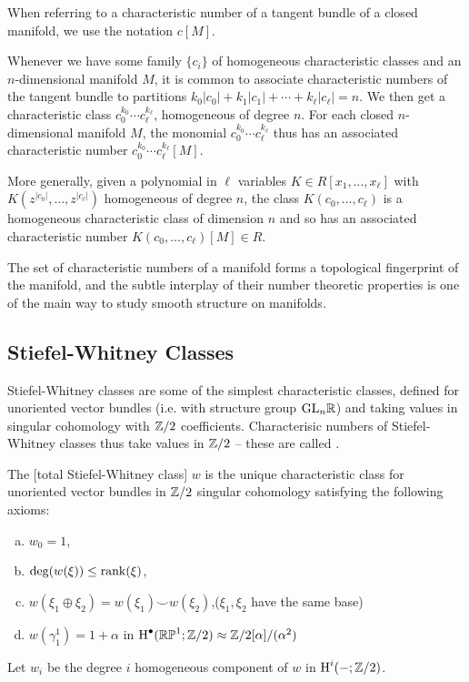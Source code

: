 \begin{convention*}
	When referring to a characteristic number of a tangent bundle of a closed manifold, we use the notation $c[M]$.
\end{convention*}

\begin{remark}\label{rmk:characteristic-number-monomial-polynomial}
	Whenever we have some family $\{c_i\}$ of homogeneous characteristic classes and an $n$-dimensional manifold $M$, it is common to associate characteristic numbers of the tangent bundle to partitions $k_0|c_0|+k_1|c_1|+\cdots+k_\ell|c_\ell| = n$. We then get a characteristic class $c_0^{k_0}\cdots c_\ell^{k_\ell}$, homogeneous of degree $n$. For each closed $n$-dimensional manifold $M$, the monomial $c_0^{k_0}\cdots c_\ell^{k_\ell}$ thus has an associated characteristic number $c_0^{k_0}\cdots c_\ell^{k_\ell}[M]$.

	More generally, given a polynomial in $\ell$ variables $K\in R[x_1,\ldots, x_\ell]$ with $K(z^{|c_0|}, \ldots, z^{|c_\ell|})$ homogeneous of degree $n$, the class $K(c_0,\ldots, c_\ell)$ is a homogeneous characteristic class of dimension $n$ and so has an associated characteristic number $K(c_0, \ldots, c_\ell)[M] \in R$.
\end{remark}

The set of characteristic numbers of a manifold forms a topological fingerprint of the manifold, and the subtle interplay of their number theoretic properties is one of the main way to study smooth structure on manifolds.

\subsection{Stiefel-Whitney Classes}

Stiefel-Whitney classes are some of the simplest characteristic classes, defined for unoriented vector bundles (i.e. with structure group $\mathrm{GL}_n\mathbb{R}$) and taking values in singular cohomology with $\mathbb{Z}/2$ coefficients. Characterisic numbers of Stiefel-Whitney classes thus take values in $\mathbb{Z}/2$ -- these are called .

\begin{definition}
	The [total Stiefel-Whitney class] $w$ is the unique characteristic class for unoriented vector bundles in $\mathbb{Z}/2$ singular cohomology satisfying the following axioms:
	\begin{enumerate}[(a)]
		\item $w_0=1$,
		\item $\deg(w(\xi))\leq \operatorname{rank}(\xi)$,
		\item $w(\xi_1\oplus \xi_2)=w(\xi_1)\smile w(\xi_2)$,\hfill ($\xi_1, \xi_2$ have the same base)
		\item $w(\gamma^1_1)=1+\alpha$ \hfill in $\operatorname{H}^\bullet(\mathbb{RP}^1;\mathbb{Z}/2)\approx \mathbb{Z}/2[\alpha]/(\alpha^2)$
	\end{enumerate}
	Let $w_i$ be the degree $i$ homogeneous component of $w$ in $\operatorname{H}^i(-;\mathbb{Z}/2)$.
\end{definition}

